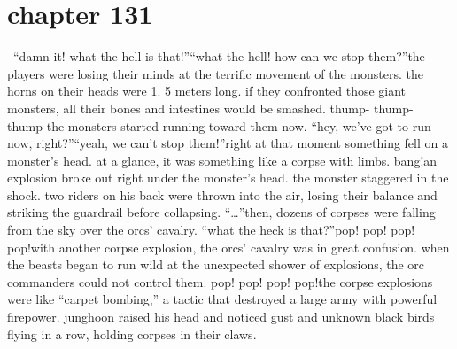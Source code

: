 \section{chapter 131}






 “damn it! what the hell is that!”“what the hell! how can we stop them?”the players were losing their minds at the terrific movement of the monsters.
 the horns on their heads were 1.
5 meters long.
 if they confronted those giant monsters, all their bones and intestines would be smashed.
thump- thump- thump-the monsters started running toward them now.
“hey, we’ve got to run now, right?”“yeah, we can’t stop them!”right at that moment something fell on a monster’s head.
 at a glance, it was something like a corpse with limbs.
bang!an explosion broke out right under the monster’s head.
 the monster staggered in the shock.
 two riders on his back were thrown into the air, losing their balance and striking the guardrail before collapsing.
“…”then, dozens of corpses were falling from the sky over the orcs’ cavalry.
“what the heck is that?”pop! pop! pop! pop!with another corpse explosion, the orcs’ cavalry was in great confusion.
 when the beasts began to run wild at the unexpected shower of explosions, the orc commanders could not control them.
pop! pop! pop! pop!the corpse explosions were like “carpet bombing,” a tactic that destroyed a large army with powerful firepower.
junghoon raised his head and noticed gust and unknown black birds flying in a row, holding corpses in their claws.

